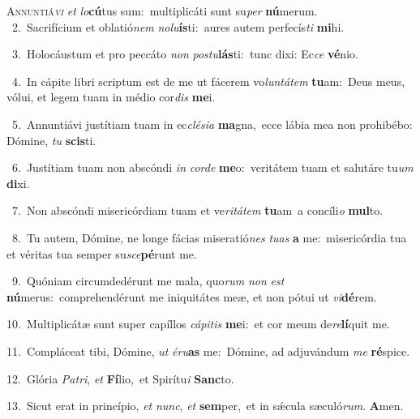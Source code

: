 \lettrine{\initial\textcolor{\initialcolor}{A}}{nnuntiá\-\textit{vi}\-} \textit{et} \textit{lo}\-\textbf{cú}tus sum:~\star multiplicáti sunt su\textit{per} \textbf{nú}\-merum.\\
{\numbfont\textcolor{\numbcolor}{~2.}}~Sacrifícium et oblatió\textit{nem} \textit{no}\-\textit{lu}\textbf{ís}ti:~\star aures autem perfecís\textit{ti} \textbf{mi}\-hi.\par
{\numbfont\textcolor{\numbcolor}{~3.}}~Holocáustum et pro peccáto \textit{non} \textit{pos}\-\textit{tu}\textbf{lás}ti:~\star tunc dixi: Ec\textit{ce} \textbf{vé}\-nio.\par
{\numbfont\textcolor{\numbcolor}{~4.}}~In cápite libri scriptum est de me ut fácerem vo\-\textit{lun}\-\textit{tá}\textit{tem} \textbf{tu}\-am:~\star Deus meus, vólui, et legem tuam in médio cor\textit{dis} \textbf{me}\-i.\par
{\numbfont\textcolor{\numbcolor}{~5.}}~Annuntiávi justítiam tuam in ec\-\textit{clé}\-\textit{si}\textit{a} \textbf{ma}\-gna,~\star ecce lábia mea non prohibébo: Dómine, \textit{tu} \textbf{scis}\-ti.\par
{\numbfont\textcolor{\numbcolor}{~6.}}~Justítiam tuam non abscóndi \textit{in} \textit{cor}\-\textit{de} \textbf{me}\-o:~\star veritátem tuam et salutáre tu\textit{um} \textbf{di}\-xi.\par
{\numbfont\textcolor{\numbcolor}{~7.}}~Non abscóndi misericórdiam tuam et ve\-\textit{ri}\-\textit{tá}\textit{tem} \textbf{tu}\-am~\star a concíli\textit{o} \textbf{mul}\-to.\par
{\numbfont\textcolor{\numbcolor}{~8.}}~Tu autem, Dómine, ne longe fácias miseratió\textit{nes} \textit{tu}\-\textit{as} \textbf{a} me:~\star misericórdia tua et véritas tua semper su\-\textit{sce}\-\textbf{pé}runt me.\par
{\numbfont\textcolor{\numbcolor}{~9.}}~Quóniam circumdedérunt me mala, quo\textit{rum} \textit{non} \textit{est} \textbf{nú}\-merus:~\star comprehendérunt me iniquitátes meæ, et non pótui ut \textit{vi}\-\textbf{dé}rem.\par
{\numbfont\textcolor{\numbcolor}{10.}}~Multiplicátæ sunt super capíllos \textit{cá}\-\textit{pi}\textit{tis} \textbf{me}\-i:~\star et cor meum de\-\textit{re}\-\textbf{lí}quit me.\par
{\numbfont\textcolor{\numbcolor}{11.}}~Compláceat tibi, Dómine, \textit{ut} \textit{é}\-\textit{ru}\textbf{as} me:~\star Dómine, ad adjuvándum \textit{me} \textbf{ré}\-spice.\par
{\numbfont\textcolor{\numbcolor}{12.}}~Glória \textit{Pa}\-\textit{tri}, \textit{et} \textbf{Fí}\-lio,~\star et Spirítu\textit{i} \textbf{Sanc}\-to.\par
{\numbfont\textcolor{\numbcolor}{13.}}~Sicut erat in princípio, \textit{et} \textit{nunc}\-, \textit{et} \textbf{sem}\-per,~\star et in sǽcula sæculó\-\textit{rum}\-. \textbf{A}\-men.\par
